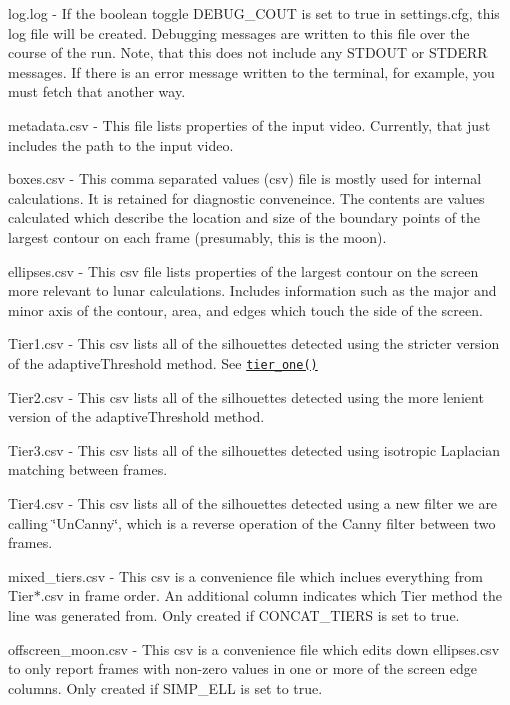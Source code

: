 \begin{DoxyItemize}
\item log.\+log -\/ If the boolean toggle {\ttfamily D\+E\+B\+U\+G\+\_\+\+C\+O\+UT} is set to {\ttfamily true} in settings.\+cfg, this log file will be created. Debugging messages are written to this file over the course of the run. Note, that this does not include any S\+T\+D\+O\+UT or S\+T\+D\+E\+RR messages. If there is an error message written to the terminal, for example, you must fetch that another way.
\item metadata.\+csv -\/ This file lists properties of the input video. Currently, that just includes the path to the input video.
\item boxes.\+csv -\/ This comma separated values (csv) file is mostly used for internal calculations. It is retained for diagnostic conveneince. The contents are values calculated which describe the location and size of the boundary points of the largest contour on each frame (presumably, this is the moon).
\item ellipses.\+csv -\/ This csv file lists properties of the largest contour on the screen more relevant to lunar calculations. Includes information such as the major and minor axis of the contour, area, and edges which touch the side of the screen.
\item Tier1.\+csv -\/ This csv lists all of the silhouettes detected using the stricter version of the {\ttfamily adaptive\+Threshold} method. See \href{https://bluenalgene.github.io/CPP_Birdtracker/html/frame__extraction_8cpp.html#a4f9b7b156d48ad3f147ff2b4edc01509}{\tt tier\+\_\+one()}
\item Tier2.\+csv -\/ This csv lists all of the silhouettes detected using the more lenient version of the {\ttfamily adaptive\+Threshold} method.
\item Tier3.\+csv -\/ This csv lists all of the silhouettes detected using isotropic Laplacian matching between frames.
\item Tier4.\+csv -\/ This csv lists all of the silhouettes detected using a new filter we are calling \char`\"{}\+Un\+Canny\char`\"{}, which is a reverse operation of the Canny filter between two frames.
\item mixed\+\_\+tiers.\+csv -\/ This csv is a convenience file which inclues everything from Tier$\ast$.csv in frame order. An additional column indicates which Tier method the line was generated from. Only created if {\ttfamily C\+O\+N\+C\+A\+T\+\_\+\+T\+I\+E\+RS} is set to {\ttfamily true}.
\item offscreen\+\_\+moon.\+csv -\/ This csv is a convenience file which edits down ellipses.\+csv to only report frames with non-\/zero values in one or more of the screen edge columns. Only created if {\ttfamily S\+I\+M\+P\+\_\+\+E\+LL} is set to {\ttfamily true}.
\end{DoxyItemize}


